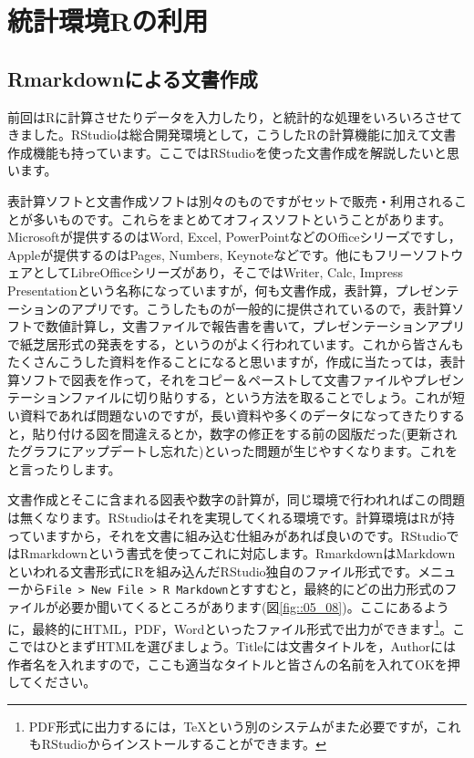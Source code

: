 \documentclass{ltjsbook}
\begin{document}
\VerbatimFootnotes
\chapter{統計環境Rの利用}
\label{m04_usingR}

\section{Rmarkdownによる文書作成}
\label{Rmarkdown}
前回はRに計算させたりデータを入力したり，と統計的な処理をいろいろさせてきました。RStudioは総合開発環境として，こうしたRの計算機能に加えて文書作成機能も持っています。ここではRStudioを使った文書作成を解説したいと思います。

表計算ソフトと文書作成ソフトは別々のものですがセットで販売・利用されることが多いものです。これらをまとめてオフィスソフトということがあります。Microsoftが提供するのはWord, Excel, PowerPointなどのOfficeシリーズですし，Appleが提供するのはPages, Numbers, Keynoteなどです。他にもフリーソフトウェアとしてLibreOfficeシリーズがあり，そこではWriter, Calc, Impress Presentationという名称になっていますが，何も文書作成，表計算，プレゼンテーションのアプリです。こうしたものが一般的に提供されているので，表計算ソフトで数値計算し，文書ファイルで報告書を書いて，プレゼンテーションアプリで紙芝居形式の発表をする，というのがよく行われています。これから皆さんもたくさんこうした資料を作ることになると思いますが，作成に当たっては，表計算ソフトで図表を作って，それをコピー＆ペーストして文書ファイルやプレゼンテーションファイルに切り貼りする，という方法を取ることでしょう。これが短い資料であれば問題ないのですが，長い資料や多くのデータになってきたりすると，貼り付ける図を間違えるとか，数字の修正をする前の図版だった(更新されたグラフにアップデートし忘れた)といった問題が生じやすくなります。これをと言ったりします。

文書作成とそこに含まれる図表や数字の計算が，同じ環境で行われればこの問題は無くなります。RStudioはそれを実現してくれる環境です。計算環境はRが持っていますから，それを文書に組み込む仕組みがあれば良いのです。RStudioではRmarkdownという書式を使ってこれに対応します。RmarkdownはMarkdownといわれる文書形式にRを組み込んだRStudio独自のファイル形式です。メニューから\verb|File > New File > R Markdown|とすすむと，最終的にどの出力形式のファイルが必要か聞いてくるところがあります(図\ref{fig::05_08})。ここにあるように，最終的にHTML，PDF，Wordといったファイル形式で出力ができます\footnote{PDF形式に出力するには，TeXという別のシステムがまた必要ですが，これもRStudioからインストールすることができます。}。ここではひとまずHTMLを選びましょう。Titleには文書タイトルを，Authorには作者名を入れますので，ここも適当なタイトルと皆さんの名前を入れてOKを押してください。
\end{document}
